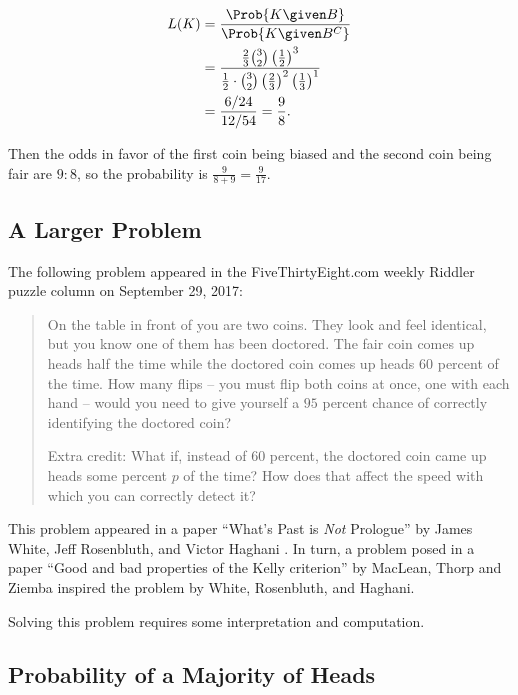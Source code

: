 \documentclass[12pt]{article}
\begin{document}
\begin{align*}
    L(K) &= \frac{\Prob{K \given B}}{\Prob{K \given B^C}} \\
    &= \frac{\frac{2}{3} \binom{3}{2} \left( \frac{1}{2} \right)^3}{\frac
    {1}{2} \cdot \binom{3}{2} \left( \frac{2}{3} \right)^2 \left(\frac{1}
    {3} \right)^1} \\
    &= \frac{6/24}{12/54} = \frac{9}{8}.
\end{align*}

Then the odds in favor of the first coin being biased and the second
coin being fair are \( 9 :  8 \), so the probability is \( \frac{9}{8+9}
= \frac{9}{17} \).

\subsection*{A Larger Problem}

The following problem appeared in the FiveThirtyEight.com weekly Riddler
puzzle column on September 29, 2017:

\begin{quotation}
    On the table in front of you are two coins.  They look and feel
    identical, but you know one of them has been doctored.  The fair
    coin comes up heads half the time while the doctored coin comes up
    heads \( 60 \) percent of the time.  How many flips -- you must flip
    both coins at once, one with each hand -- would you need to give
    yourself a \( 95 \) percent chance of correctly identifying the
    doctored coin?

    Extra credit:  What if, instead of \( 60 \) percent, the doctored
    coin came up heads some percent \( p \) of the time?  How does that
    affect the speed with which you can correctly detect it?
\end{quotation}

This problem appeared in a paper ``What's Past is \emph{Not} Prologue''
by James White, Jeff Rosenbluth, and Victor Haghani
\cite{white17}.  In turn, a problem posed in a paper ``Good and bad
properties of the Kelly criterion'' by MacLean, Thorp and Ziemba
\cite{maclean10} inspired the problem by White, Rosenbluth, and Haghani.

Solving this problem requires some interpretation and computation.

\subsection*{Probability of a Majority of Heads}
\end{document}
